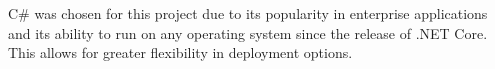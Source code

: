 


C# was chosen for this project due to its popularity in enterprise applications
and its ability to run on any operating system since the release of .NET Core.
This allows for greater flexibility in deployment options. 
